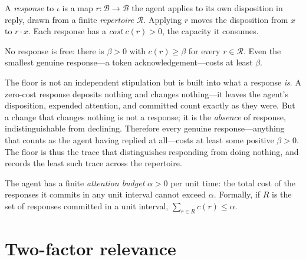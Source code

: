 \documentclass[11pt,twocolumn,a4paper]{article}
\newcommand{\Beh}{\mathcal{B}}       %
\newcommand{\Int}{\iota}             %
\newcommand{\resp}{r}                %
\newcommand{\Resp}{\mathcal{R}}      %
\newcommand{\floorc}{\beta}          %
\newcommand{\att}{\alpha}            %
\newcommand{\cost}{c}                %
\begin{document}
\begin{definition}
\label{def:response}
A \emph{response} to $\Int$ is a map $\resp:\Beh\to\Beh$ the agent applies
to its own disposition in reply, drawn from a finite \emph{repertoire}
$\Resp$. Applying $\resp$ moves the disposition from $x$ to
$\resp\!\cdot x$. Each response has a \emph{cost} $\cost(\resp)>0$,
the capacity it consumes.
\end{definition}

\begin{axiom}
\label{ax:floor}
No response is free: there is $\floorc>0$ with $\cost(\resp)\ge\floorc$ for
every $\resp\in\Resp$. Even the smallest genuine response---a token
acknowledgement---costs at least $\floorc$.
\end{axiom}

\begin{remark}
\label{rem:floor-earned}
The floor is not an independent stipulation but is built into what a
response \emph{is}. A zero-cost response deposits nothing and changes
nothing---it leaves the agent's disposition, expended attention, and
committed count exactly as they were. But a change that changes nothing is
not a response; it is the \emph{absence} of response, indistinguishable from
declining. Therefore every genuine response---anything that counts as the
agent having replied at all---costs at least some positive $\floorc>0$. The
floor is thus the trace that distinguishes responding from doing nothing,
and  records the least such trace across the repertoire.
\end{remark}

\begin{axiom}
\label{ax:attention}
The agent has a finite \emph{attention budget} $\att>0$ per unit time: the
total cost of the responses it commits in any unit interval cannot exceed
$\att$. Formally, if $R$ is the set of responses committed in a unit
interval, $\sum_{\resp\in R}\cost(\resp)\le\att$.
\end{axiom}

\section{Two-factor relevance}
\label{sec:relevance}
\end{document}
